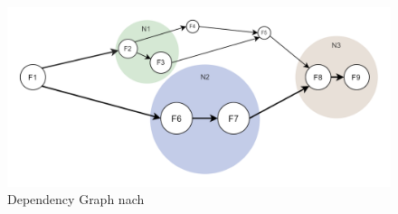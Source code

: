 \documentclass[a4paper,twoside,11pt, pagesize]{scrartcl}
\begin{document}
\begin{spacing}{1.2}
\begin{figure}[H]
\label{fig:dependencyGraph}
\centering
\includegraphics[width=1\textwidth]{DependencyGraph}
\caption{Dependency Graph nach \cite{shafiei2020serverless}}
\end{figure}

\end{spacing}
\end{document}
